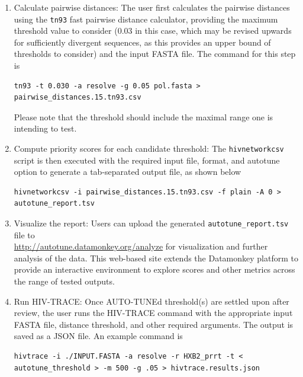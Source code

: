 \documentclass[utf8]{FrontiersinHarvard} %
\begin{document}
\begin{enumerate}

	\item{ Calculate pairwise distances: The user first calculates the pairwise distances using the {\tt tn93} fast pairwise distance calculator, providing the maximum threshold value to consider ($0.03$ in this case, which may be revised upwards for sufficiently divergent sequences, as this provides an upper bound of thresholds to consider) and the input FASTA file. The command for this step is
	            \begin{lstlisting}[style=BashInputStyle]
 tn93 -t 0.030 -a resolve -g 0.05 pol.fasta > pairwise_distances.15.tn93.csv
\end{lstlisting}

	            Please note that the threshold should include the maximal range one is
	            intending to test.

	      }

	\item {Compute priority scores for each candidate threshold: The {\tt hivnetworkcsv} script is then executed with the required input file, format, and autotune option to generate a tab-separated output file, as shown below
	      \begin{lstlisting}[style=BashInputStyle]
 hivnetworkcsv -i pairwise_distances.15.tn93.csv -f plain -A 0 > autotune_report.tsv
\end{lstlisting}
	      }

	\item {Visualize the report: Users can upload the generated {\tt autotune\_report.tsv} file to \\
	      \url{http://autotune.datamonkey.org/analyze} for visualization and further analysis of the data. This web-based site extends the Datamonkey platform \citep{weaver_datamonkey_2018} to provide an interactive environment to explore scores and other metrics across the range of tested outputs. }

	\item {Run HIV-TRACE: Once AUTO-TUNEd threshold(s) are settled upon after review, the user runs the HIV-TRACE command with the appropriate input FASTA file, distance threshold, and other required arguments. The output is saved as a JSON file. An example command is
	      \begin{lstlisting}[style=BashInputStyle]
hivtrace -i ./INPUT.FASTA -a resolve -r HXB2_prrt -t < autotune_threshold > -m 500 -g .05 > hivtrace.results.json
	\end{lstlisting}
	      }


\end{enumerate}
\end{document}
